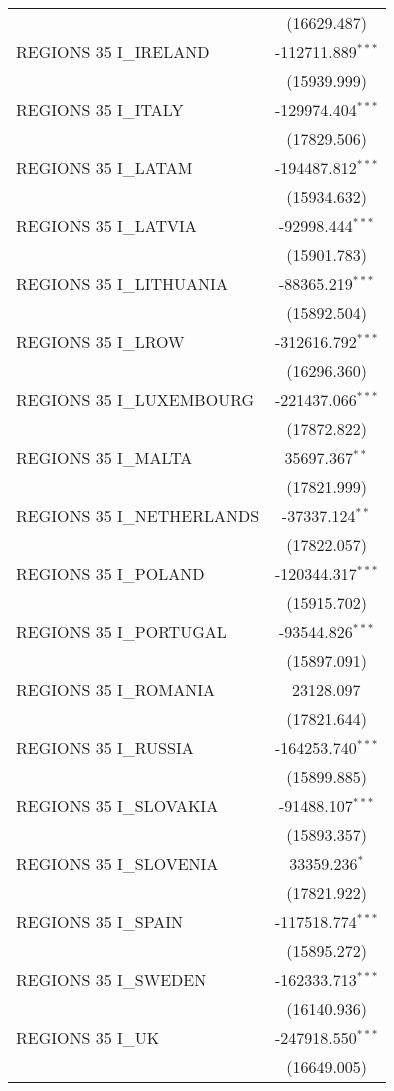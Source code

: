 \begin{table}[!htbp]
\begin{tabular}{@{\extracolsep{5pt}}lc}
& (16629.487) \\
 REGIONS 35 I_IRELAND & -112711.889$^{***}$ \\
& (15939.999) \\
 REGIONS 35 I_ITALY & -129974.404$^{***}$ \\
& (17829.506) \\
 REGIONS 35 I_LATAM & -194487.812$^{***}$ \\
& (15934.632) \\
 REGIONS 35 I_LATVIA & -92998.444$^{***}$ \\
& (15901.783) \\
 REGIONS 35 I_LITHUANIA & -88365.219$^{***}$ \\
& (15892.504) \\
 REGIONS 35 I_LROW & -312616.792$^{***}$ \\
& (16296.360) \\
 REGIONS 35 I_LUXEMBOURG & -221437.066$^{***}$ \\
& (17872.822) \\
 REGIONS 35 I_MALTA & 35697.367$^{**}$ \\
& (17821.999) \\
 REGIONS 35 I_NETHERLANDS & -37337.124$^{**}$ \\
& (17822.057) \\
 REGIONS 35 I_POLAND & -120344.317$^{***}$ \\
& (15915.702) \\
 REGIONS 35 I_PORTUGAL & -93544.826$^{***}$ \\
& (15897.091) \\
 REGIONS 35 I_ROMANIA & 23128.097$^{}$ \\
& (17821.644) \\
 REGIONS 35 I_RUSSIA & -164253.740$^{***}$ \\
& (15899.885) \\
 REGIONS 35 I_SLOVAKIA & -91488.107$^{***}$ \\
& (15893.357) \\
 REGIONS 35 I_SLOVENIA & 33359.236$^{*}$ \\
& (17821.922) \\
 REGIONS 35 I_SPAIN & -117518.774$^{***}$ \\
& (15895.272) \\
 REGIONS 35 I_SWEDEN & -162333.713$^{***}$ \\
& (16140.936) \\
 REGIONS 35 I_UK & -247918.550$^{***}$ \\
& (16649.005) \\

\end{tabular}
\end{table}
